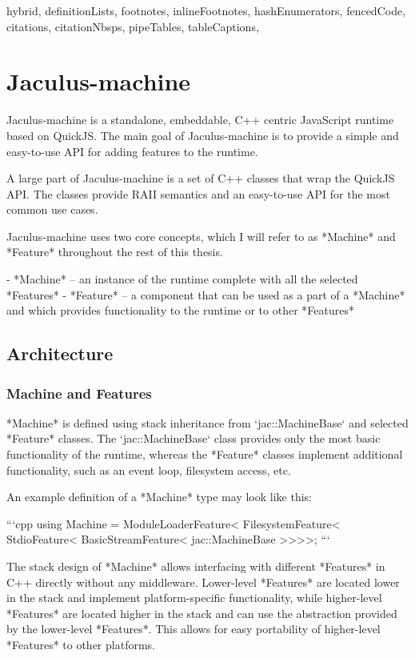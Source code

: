 \documentclass[
  digital,
  oneside,
  nosansbold,
  nocolorbold,
  lof,
  lot
]{fithesis4}
\begin{document}
\begin{markdown*}{%
  hybrid,
  definitionLists,
  footnotes,
  inlineFootnotes,
  hashEnumerators,
  fencedCode,
  citations,
  citationNbsps,
  pipeTables,
  tableCaptions,
}
\chapter{Jaculus-machine}

Jaculus-machine is a standalone, embeddable, C++ centric JavaScript runtime based on QuickJS. The main goal of Jaculus-machine is to provide a simple and easy-to-use API for adding features to the runtime.

A large part of Jaculus-machine is a set of C++ classes that wrap the QuickJS API. The classes provide RAII semantics and an easy-to-use API for the most common use cases.

Jaculus-machine uses two core concepts, which I will refer to as *Machine* and *Feature* throughout the rest of this thesis.

  - *Machine* -- an instance of the runtime complete with all the selected *Features*
  - *Feature* -- a component that can be used as a part of a *Machine* and which provides functionality to the runtime or to other *Features*

\section{Architecture}

\subsection{Machine and Features}

*Machine* is defined using stack inheritance from `jac::MachineBase` and selected *Feature* classes. The `jac::MachineBase` class provides only the most basic functionality of the runtime, whereas the *Feature* classes implement additional functionality, such as an event loop, filesystem access, etc.

An example definition of a *Machine* type may look like this:

```cpp
using Machine =
    ModuleLoaderFeature<
    FilesystemFeature<
    StdioFeature<
    BasicStreamFeature<
    jac::MachineBase
>>>>;
```

The stack design of *Machine* allows interfacing with different *Features* in C++ directly without any middleware. Lower-level *Features* are located lower in the stack and implement platform-specific functionality, while higher-level *Features* are located higher in the stack and can use the abstraction provided by the lower-level *Features*. This allows for easy portability of higher-level *Features* to other platforms.


\end{markdown*}
\end{document}
